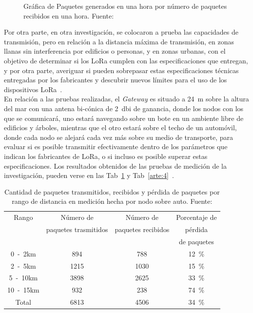 \begin{justify}
\begin{figure}[!ht]
\caption{Gráfica de Paquetes generados en una hora por número de paquetes recibidos en una hora. Fuente:\cite{Xavier}}
\label{arte:2}
\end{figure}
Por otra parte, en otra investigación, se colocaron a prueba las capacidades de transmisión, pero en relación a la distancia máxima de transmisión, en zonas llanas sin interferencia por edificios o personas, y en zonas urbanas, con el objetivo de determinar si los LoRa cumplen con las especificaciones que entregan, y por otra parte, averiguar si pueden sobrepasar estas especificaciones técnicas entregadas por los fabricantes y descubrir nuevos límites para el uso de los dispositivos LoRa~\cite{Juha}.\\
En relación a las pruebas realizadas, el \textit{Gateway} es situado a \SI{24}{\meter} sobre la altura del mar con una antena bi-cónica de \SI{2}{dbi} de ganancia, donde los nodos con los que se comunicará, uno estará navegando sobre un bote en un ambiente libre de edificios y árboles, mientras que el otro estará sobre el techo de un automóvil, donde cada nodo se alejará cada vez más sobre su medio de transporte, para evaluar si es posible transmitir efectivamente dentro de los parámetros que indican los fabricantes de LoRa, o si incluso es posible superar estas especificaciones. Los resultados obtenidos de las pruebas de medición de la investigación, pueden verse en las Tab~\ref{arte:3} y Tab~\ref{arte:4}~\cite{Juha}.\\
\begin{table}[!ht]
\centering
\begin{tabular}{|c|c|c|c|}
\hline
Rango & Número de            & Número de          & Porcentaje de  \\
      & paquetes trasmitidos & paquetes recibidos &  pérdida\\ 
      &                      &                    &   de paquetes \\ \hline
\si{0-2}{km} & \num{894} & \num{788} & \SI{12}{\percent} \\ \hline
\si{2-5}{km} & \num{1215} & \num{1030} & \SI{15}{\percent} \\ \hline
\si{5-10}{km} & \num{3898} & \num{2625} & \SI{33}{\percent} \\ \hline
\si{10-15}{km} & \num{932} & \num{238} & \SI{74}{\percent} \\ \hline
Total & \num{6813} & \num{4506} & \SI{34}{\percent} \\ \hline
\end{tabular}
\caption{Cantidad de paquetes transmitidos, recibidos y pérdida de paquetes por rango de distancia en medición hecha por nodo sobre auto. Fuente:\cite{Juha}}
\label{arte:3}
\end{table}


\end{justify}
